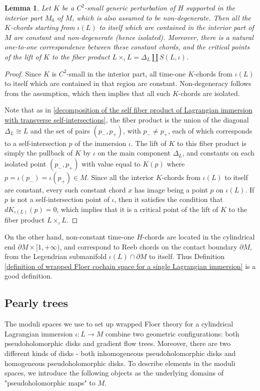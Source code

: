 \documentclass{amsart}
\newtheorem{lemma}[theorem]{Lemma}
\numberwithin{equation}{section}
\numberwithin{figure}{section}
\begin{document}
\begin{lemma}\label{interior chords corresponds to Morse critical points on the fiber product}
	Let $K$ be a $C^{2}$-small generic perturbation of $H$ supported in the interior part $M_{0}$ of $M$, which is also assumed to be non-degenerate. Then all the $K$-chords starting from $\iota(L)$ to itself which are contained in the interior part of $M$ are constant and non-degenerate (hence isolated). Moreover, there is a natural one-to-one correspondence between these constant chords, and the critical points of the lift of $K$ to the fiber product $L \times_{\iota} L = \Delta_{L} \coprod S(L, \iota)$.
\end{lemma}
\begin{proof}
	Since $K$ is $C^{2}$-small in the interior part, all time-one $K$-chords from $\iota(L)$ to itself which are contained in that region are constant. Non-degeneracy follows from the assumption, which then implies that all such $K$-chords are isolated. \par
	Note that as in \eqref{decomposition of the self fiber product of Lagrangian immersion with transverse self-intersections}, the fiber product is the union of the diagonal $\Delta_{L} \cong L$ and the set of pairs $(p_{-}, p_{+})$, with $p_{-} \neq p_{+}$, each of which corresponds to a self-intersection $p$ of the immersion $\iota$. The lift of $K$ to this fiber product is simply the pullback of $K$ by $\iota$ on the main component $\Delta_{L}$, and constants on each isolated point $(p_{-}, p_{+})$ with value equal to $K(p)$ where $p = \iota(p_{-}) = \iota(p_{+}) \in M$. Since all the interior $K$-chords from $\iota(L)$ to itself are constant, every such constant chord $x$ has image being a point $p$ on $\iota(L)$. If $p$ is not a self-intersection point of $\iota$, then it satisfies the condition that $dK_{\iota(L)}(p)=0$, which implies that it is a critical point of the lift of $K$ to the fiber product $L \times_{\iota} L$.
\end{proof}

	On the other hand, non-constant time-one $H$-chords are located in the cylindrical end $\partial M \times [1, +\infty)$, and correspond to Reeb chords on the contact boundary $\partial M$, from the Legendrian submanifold $\iota(L) \cap \partial M$ to itself. Thus Definition \ref{definition of wrapped Floer cochain space for a single Lagrangian immersion} is a good definition. \par

\subsection{Pearly trees}
	The moduli spaces we use to set up wrapped Floer theory for a cylindrical Lagrangian immersion $\iota: L \to M$ combine two geometric configurations: both pseudoholomorphic disks and gradient flow trees. Moreover, there are two different kinds of disks - both inhomogeneous pseudoholomorphic disks and homogeneous pseudoholomorphic disks. To describe elements in the moduli spaces, we introduce the following objects as the underlying domains of "pseudoholomorphic maps" to $M$. \par
\end{document}
